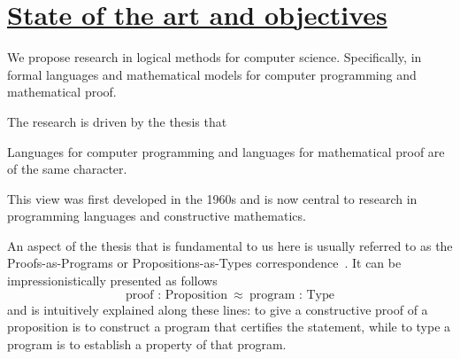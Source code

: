 \documentclass[11pt,twocolumn]{article}
\newenvironment{myitemize}
  {\begin{list}{$\bullet$}
  {\setlength{\topsep}{2pt}
   \setlength{\partopsep}{2pt}
   \setlength{\itemsep}{2.5pt}
   \setlength{\parsep}{2.5pt}
   \setlength{\leftmargin}{1em}
   \setlength{\labelwidth}{.5em}}}
  {\end{list}}
\newenvironment{myquote}
  {\begin{list}{}
  {\setlength{\topsep}{2pt}
   \setlength{\partopsep}{2pt}
   \setlength{\itemsep}{2.5pt}
   \setlength{\parsep}{2.5pt}
   \setlength{\rightmargin}{1em}
   \setlength{\leftmargin}{1em}
   \setlength{\labelwidth}{.5em}}}
  {\end{list}}
\newcommand{\eg}{\emph{eg.}}
\begin{document}
\setlength{\abovedisplayskip}{5pt}
\setlength{\belowdisplayskip}{5pt}



\section{\underline{State of the art and ob}j\underline{ectives}}
\label{StateOfTheArtSection}

We propose research in logical methods for computer science.  Specifically, in
formal languages and mathematical models for computer programming and
mathematical proof.


The research is driven by the thesis that
\begin{myquote}
\item
Languages 
for computer programming
and languages 
for mathematical proof 
are of the same character.
\end{myquote}
This view %
was first developed %
in the 1960s %
and is now central to research in programming languages and constructive
mathematics.

An aspect of the thesis that is fundamental to us here is usually referred
to as the Proofs-as-Programs or Propositions-as-Types
correspondence~\cite{Curry1934,Howard1969}.
It can be impressionistically %
presented %
as follows
\[%
%
  \mbox{proof : Proposition} 
  \enspace \approx \enspace 
  \mbox{program : Type} 
\]
and is intuitively explained along 
these lines: %
  to give a constructive proof of a proposition 
  is to construct a program that certifies the statement, 
  while
  to type a program is to establish a property of that program.
\end{document}
